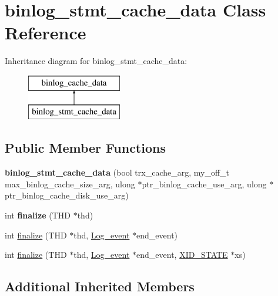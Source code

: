 \hypertarget{classbinlog__stmt__cache__data}{}\section{binlog\+\_\+stmt\+\_\+cache\+\_\+data Class Reference}
\label{classbinlog__stmt__cache__data}
Inheritance diagram for binlog\+\_\+stmt\+\_\+cache\+\_\+data\+:\begin{figure}[H]
\begin{center}
\leavevmode
\includegraphics[height=2.000000cm]{classbinlog__stmt__cache__data}
\end{center}
\end{figure}
\subsection*{Public Member Functions}
\begin{DoxyCompactItemize}
\item 
\mbox{\label{classbinlog__stmt__cache__data_a9b973f4f715a10ace331827178ded599}} 
{\bfseries binlog\+\_\+stmt\+\_\+cache\+\_\+data} (bool trx\+\_\+cache\+\_\+arg, my\+\_\+off\+\_\+t max\+\_\+binlog\+\_\+cache\+\_\+size\+\_\+arg, ulong $\ast$ptr\+\_\+binlog\+\_\+cache\+\_\+use\+\_\+arg, ulong $\ast$ptr\+\_\+binlog\+\_\+cache\+\_\+disk\+\_\+use\+\_\+arg)
\item 
int {\bfseries finalize} (T\+HD $\ast$thd)
\item 
int \mbox{\hyperlink{classbinlog__stmt__cache__data_a3367fa8c1daced18065f6b9dea5385fe}{finalize}} (T\+HD $\ast$thd, \mbox{\hyperlink{classLog__event}{Log\+\_\+event}} $\ast$end\+\_\+event)
\item 
int \mbox{\hyperlink{classbinlog__stmt__cache__data_a16bd8b16b092443137c073f18c7e11e4}{finalize}} (T\+HD $\ast$thd, \mbox{\hyperlink{classLog__event}{Log\+\_\+event}} $\ast$end\+\_\+event, \mbox{\hyperlink{classXID__STATE}{X\+I\+D\+\_\+\+S\+T\+A\+TE}} $\ast$xs)
\end{DoxyCompactItemize}
\subsection*{Additional Inherited Members}


